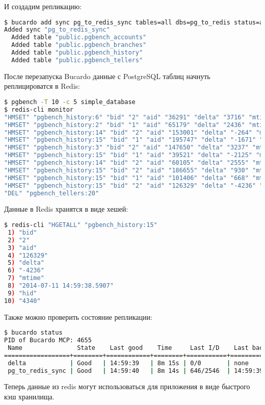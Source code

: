 И создадим репликацию:

\begin{lstlisting}[language=Bash,label=lst:bucardo-redis4,caption=Установка sync]
$ bucardo add sync pg_to_redis_sync tables=all dbs=pg_to_redis status=active
Added sync "pg_to_redis_sync"
  Added table "public.pgbench_accounts"
  Added table "public.pgbench_branches"
  Added table "public.pgbench_history"
  Added table "public.pgbench_tellers"
\end{lstlisting}

После перезапуска Bucardo данные с PostgreSQL таблиц начнуть реплицироватся в Redis:

\begin{lstlisting}[language=Bash,label=lst:bucardo-redis5,caption=Репликация в redis]
$ pgbench -T 10 -c 5 simple_database
$ redis-cli monitor
"HMSET" "pgbench_history:6" "bid" "2" "aid" "36291" "delta" "3716" "mtime" "2014-07-11 14:59:38.454824" "hid" "4331"
"HMSET" "pgbench_history:2" "bid" "1" "aid" "65179" "delta" "2436" "mtime" "2014-07-11 14:59:38.500896" "hid" "4332"
"HMSET" "pgbench_history:14" "bid" "2" "aid" "153001" "delta" "-264" "mtime" "2014-07-11 14:59:38.472706" "hid" "4333"
"HMSET" "pgbench_history:15" "bid" "1" "aid" "195747" "delta" "-1671" "mtime" "2014-07-11 14:59:38.509839" "hid" "4334"
"HMSET" "pgbench_history:3" "bid" "2" "aid" "147650" "delta" "3237" "mtime" "2014-07-11 14:59:38.489878" "hid" "4335"
"HMSET" "pgbench_history:15" "bid" "1" "aid" "39521" "delta" "-2125" "mtime" "2014-07-11 14:59:38.526317" "hid" "4336"
"HMSET" "pgbench_history:14" "bid" "2" "aid" "60105" "delta" "2555" "mtime" "2014-07-11 14:59:38.616935" "hid" "4337"
"HMSET" "pgbench_history:15" "bid" "2" "aid" "186655" "delta" "930" "mtime" "2014-07-11 14:59:38.541296" "hid" "4338"
"HMSET" "pgbench_history:15" "bid" "1" "aid" "101406" "delta" "668" "mtime" "2014-07-11 14:59:38.560971" "hid" "4339"
"HMSET" "pgbench_history:15" "bid" "2" "aid" "126329" "delta" "-4236" "mtime" "2014-07-11 14:59:38.5907" "hid" "4340"
"DEL" "pgbench_tellers:20"
\end{lstlisting}

Данные в Redis хранятся в виде хешей:

\begin{lstlisting}[language=Bash,label=lst:bucardo-redis6,caption=Данные в redis]
$ redis-cli "HGETALL" "pgbench_history:15"
 1) "bid"
 2) "2"
 3) "aid"
 4) "126329"
 5) "delta"
 6) "-4236"
 7) "mtime"
 8) "2014-07-11 14:59:38.5907"
 9) "hid"
10) "4340"
\end{lstlisting}

Также можно проверить состояние репликации:

\begin{lstlisting}[language=Bash,label=lst:bucardo-redis6,caption=Установка redis]
$ bucardo status
PID of Bucardo MCP: 4655
 Name               State    Last good    Time     Last I/D    Last bad    Time
==================+========+============+========+===========+===========+========
 delta            | Good   | 14:59:39   | 8m 15s | 0/0       | none      |
 pg_to_redis_sync | Good   | 14:59:40   | 8m 14s | 646/2546  | 14:59:39  | 8m 15s
\end{lstlisting}

Теперь данные из redis могут использоваться для приложения в виде быстрого кэш хранилища.
